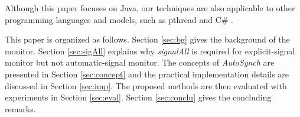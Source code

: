 \documentclass{sigplanconf}
\begin{document}


Although this paper 
focuses on Java, our techniques are also applicable to other programming 
languages and models, such as pthread and C\# \cite{hwg03}.


This paper is organized as follows. Section \ref{sec:bg} gives the background
of the monitor. 
Section \ref{sec:sigAll} explains why {\em signalAll} is required for
explicit-signal monitor but not automatic-signal monitor. The concepts of 
{\em AutoSynch} are presented in Section \ref{sec:concept} and the practical 
implementation details are discussed in Section  \ref{sec:imp}. The proposed 
methods are then evaluated with experiments in Section \ref{sec:eval}.  
Section \ref{sec:conclu} gives the concluding remarks.
\end{document}
